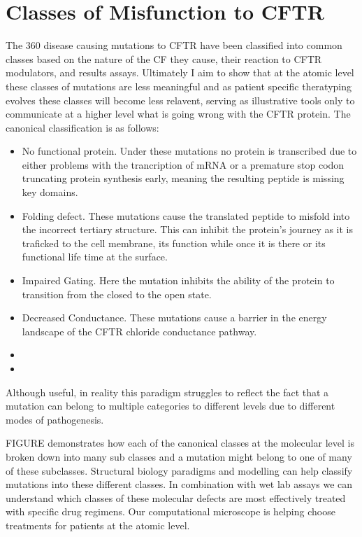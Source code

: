 \section{Classes of Misfunction to CFTR}
The 360 disease causing mutations to CFTR have been classified into common classes based on the nature of the CF they cause, their reaction to CFTR modulators, and results  assays. Ultimately I aim to show that at the atomic level these classes of mutations are less meaningful and as patient specific theratyping evolves these classes will become less relavent, serving as illustrative tools only to communicate at a higher level what is going wrong with the CFTR protein. The canonical classification is as follows:
\begin{itemize}
	\item {} No functional protein. Under these mutations no protein is transcribed due to either problems with the trancription of mRNA or a premature stop codon truncating protein synthesis early, meaning the resulting peptide is missing key domains. 
	\item {} Folding defect. These mutations cause the translated peptide to misfold into the incorrect tertiary structure. This can inhibit the protein's journey as it is traficked to the cell membrane, its function while once it is there or its functional life time at the surface. 
	\item {} Impaired Gating. Here the mutation inhibits the ability of the protein to transition from the closed to the open state. 
	\item {} Decreased Conductance. These mutations cause a barrier in the energy landscape of the CFTR chloride conductance pathway.
	\item {}
	\item {}
\end{itemize}

Although useful, in reality this paradigm struggles to reflect the fact that a mutation can belong to multiple categories to different levels due to different modes of pathogenesis.

FIGURE demonstrates how each of the canonical classes at the molecular level is broken down into many sub classes and a mutation might belong to one of many of these subclasses. Structural biology paradigms and  modelling can help classify mutations into these different classes. In combination with wet lab assays we can understand which classes of these molecular defects are most effectively treated with specific drug regimens. Our computational microscope is helping choose treatments for patients at the atomic level. 

